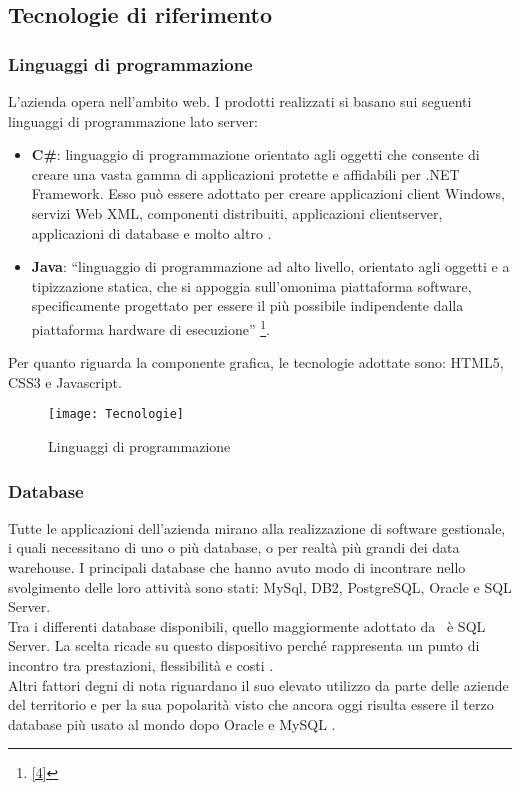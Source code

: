 \subsection{Tecnologie di riferimento}
\label{cap1:Tecnologie di riferimento}
\subsubsection*{Linguaggi di programmazione}

L'azienda opera nell'ambito web. I prodotti realizzati si basano sui seguenti linguaggi di programmazione lato server: 
\begin{itemize}
	\item \textbf{C\#}: linguaggio di programmazione orientato agli oggetti che consente di creare una vasta gamma di applicazioni protette e affidabili per .NET Framework. Esso può essere adottato per creare applicazioni client Windows, servizi Web XML, componenti distribuiti, applicazioni client\-server, applicazioni di database e molto altro \hyperref[bib3]{\cite{[3]}}.
	
	\item \textbf{Java}: ``linguaggio di programmazione ad alto livello, orientato agli oggetti e a tipizzazione statica, che si appoggia sull'omonima piattaforma software, specificamente progettato per essere il più possibile indipendente dalla piattaforma hardware di esecuzione'' \footnote[1]{\hyperref[bib4]{[4]}}.
\end{itemize}

Per quanto riguarda la componente grafica, le tecnologie adottate sono: HTML5, CSS3 e Javascript.

\begin{figure}[!h] 
	\centering 
	\texttt{[image: Tecnologie]} 
	\caption{Linguaggi di programmazione}
	\label{tecnologie}
\end{figure}

\subsubsection*{Database}
Tutte le applicazioni dell'azienda mirano alla realizzazione di software gestionale, i quali necessitano di uno o più database, o per realtà più grandi dei data warehouse. I principali  database che hanno avuto modo di incontrare nello svolgimento delle loro attività sono stati: MySql, DB2, PostgreSQL, Oracle e SQL Server.\\

Tra i differenti database disponibili, quello maggiormente adottato da \azienda\ è SQL Server. La scelta ricade su questo dispositivo perché rappresenta un punto di incontro tra prestazioni, flessibilità e costi \hyperref[bib5]{\cite{[5]}}.\\
Altri fattori degni di nota riguardano il suo elevato utilizzo da parte delle aziende del territorio e per la sua popolarità visto che ancora oggi risulta essere il terzo database più usato al mondo dopo Oracle e MySQL \hyperref[bib6]{\cite{[6]}}. 

